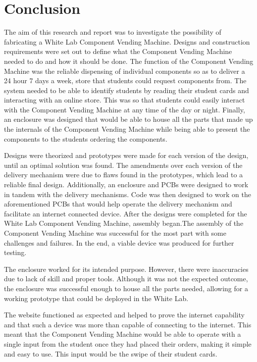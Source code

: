 \documentclass[a4paper,11pt]{article}
\numberwithin{figure}{section}
\numberwithin{table}{section}
\begin{document}
\section{Conclusion}\thispagestyle{sectionstart}
The aim of this research and report was to investigate the possibility of fabricating a White Lab Component Vending Machine. Designs and construction requirements were set out to define what the Component Vending Machine needed to do and how it should be done. The function of the Component Vending Machine was the reliable dispensing of individual components so as to deliver a 24 hour 7 days a week, store that students could request components from. The system needed to be able to identify students by reading their student cards and interacting with an online store. This was so that students could easily interact with the Component Vending Machine at any time of the day or night. Finally, an enclosure was designed that would be able to house all the parts that made up the internals of the Component Vending Machine while being able to present the components to the students ordering the components.

Designs were theorized and prototypes were made for each version of the design, until an optimal solution was found. The amendments over each version of the delivery mechanism were due to flaws found in the prototypes, which lead to a reliable final design. Additionally, an enclosure and PCBs were designed to work in tandem with the delivery mechanisms. Code was then designed to work on the aforementioned PCBs that would help operate the delivery mechanism and facilitate an internet connected device. After the designs were completed for the White Lab Component Vending Machine, assembly began.The assembly of the Component Vending Machine was successful for the most part with some challenges and failures. In the end, a viable device was produced for further testing. 

The enclosure worked for its intended purpose. However, there were inaccuracies due to lack of skill and proper tools. Although it was not the expected outcome, the enclosure was successful enough to house all the parts needed, allowing for a working prototype that could be deployed in the White Lab.

The website functioned as expected and helped to prove the internet capability and that such a device was more than capable of connecting to the internet. This meant that the Component Vending Machine would be able to operate with a single input from the student once they had placed their orders, making it simple and easy to use. This input would be the swipe of their student cards. 
\end{document}
